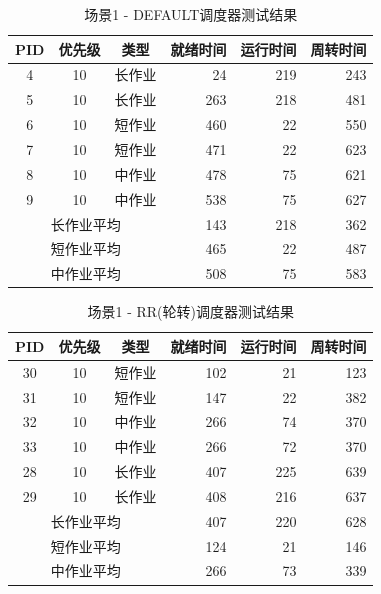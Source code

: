 \documentclass[a4paper, 12pt]{article}
\begin{document}
\begin{table}[H]
	\centering
	\caption{场景1 - DEFAULT调度器测试结果}
	\begin{tabular}{cccrrr}
		\toprule
		\textbf{PID} & \textbf{优先级} & \textbf{类型} & \textbf{就绪时间} & \textbf{运行时间} & \textbf{周转时间} \\
		\midrule
		4 & 10 & 长作业 & 24 & 219 & 243 \\
		5 & 10 & 长作业 & 263 & 218 & 481 \\
		6 & 10 & 短作业 & 460 & 22 & 550 \\
		7 & 10 & 短作业 & 471 & 22 & 623 \\
		8 & 10 & 中作业 & 478 & 75 & 621 \\
		9 & 10 & 中作业 & 538 & 75 & 627 \\
		\midrule
		\multicolumn{3}{c}{长作业平均} & 143 & 218 & 362 \\
		\multicolumn{3}{c}{短作业平均} & 465 & 22 & 487 \\
		\multicolumn{3}{c}{中作业平均} & 508 & 75 & 583 \\
		\bottomrule
	\end{tabular}
\end{table}

\begin{table}[H]
	\centering
	\caption{场景1 - RR(轮转)调度器测试结果}
	\begin{tabular}{cccrrr}
		\toprule
		\textbf{PID} & \textbf{优先级} & \textbf{类型} & \textbf{就绪时间} & \textbf{运行时间} & \textbf{周转时间} \\
		\midrule
		30 & 10 & 短作业 & 102 & 21 & 123 \\
		31 & 10 & 短作业 & 147 & 22 & 382 \\
		32 & 10 & 中作业 & 266 & 74 & 370 \\
		33 & 10 & 中作业 & 266 & 72 & 370 \\
		28 & 10 & 长作业 & 407 & 225 & 639 \\
		29 & 10 & 长作业 & 408 & 216 & 637 \\
		\midrule
		\multicolumn{3}{c}{长作业平均} & 407 & 220 & 628 \\
		\multicolumn{3}{c}{短作业平均} & 124 & 21 & 146 \\
		\multicolumn{3}{c}{中作业平均} & 266 & 73 & 339 \\
		\bottomrule
	\end{tabular}
\end{table}
\end{document}
